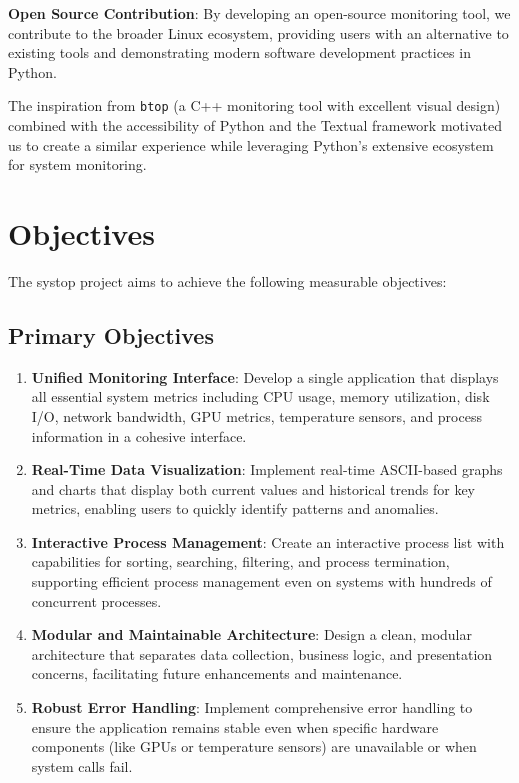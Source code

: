 \documentclass[12pt,a4paper,oneside]{report}
\begin{document}
\textbf{Open Source Contribution}: By developing an open-source monitoring tool, we contribute to the broader Linux ecosystem, providing users with an alternative to existing tools and demonstrating modern software development practices in Python.

The inspiration from \texttt{btop} (a C++ monitoring tool with excellent visual design) combined with the accessibility of Python and the Textual framework motivated us to create a similar experience while leveraging Python's extensive ecosystem for system monitoring.

\section{Objectives}
\label{sec:objectives}

The systop project aims to achieve the following measurable objectives:

\subsection{Primary Objectives}

\begin{enumerate}
    \item \textbf{Unified Monitoring Interface}: Develop a single application that displays all essential system metrics including CPU usage, memory utilization, disk I/O, network bandwidth, GPU metrics, temperature sensors, and process information in a cohesive interface.
    
    \item \textbf{Real-Time Data Visualization}: Implement real-time ASCII-based graphs and charts that display both current values and historical trends for key metrics, enabling users to quickly identify patterns and anomalies.
    
    \item \textbf{Interactive Process Management}: Create an interactive process list with capabilities for sorting, searching, filtering, and process termination, supporting efficient process management even on systems with hundreds of concurrent processes.
    
    \item \textbf{Modular and Maintainable Architecture}: Design a clean, modular architecture that separates data collection, business logic, and presentation concerns, facilitating future enhancements and maintenance.
    
    \item \textbf{Robust Error Handling}: Implement comprehensive error handling to ensure the application remains stable even when specific hardware components (like GPUs or temperature sensors) are unavailable or when system calls fail.
\end{enumerate}
\end{document}
